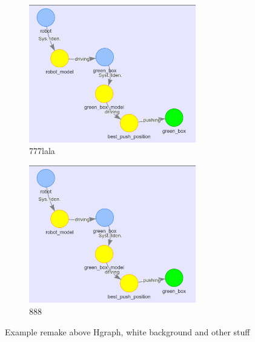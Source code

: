 \begin{figure}[H]
    \begin{subfigure}{.49\textwidth}
    \centering
    \includegraphics[width=0.8\textwidth]{figures/example_hyp_graph/6}
    \caption{777lala}%
    \end{subfigure}
    \hfill
    \begin{subfigure}{.49\textwidth}
    \centering
    \includegraphics[width=0.8\textwidth]{figures/example_hyp_graph/6}
    \caption{888}%
    \end{subfigure}

    \caption{Example remake above Hgraph, white background and other stuff}%
    \label{fig:blocked_path_example_environment}
\end{figure}

